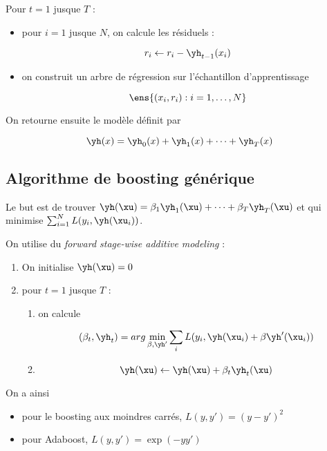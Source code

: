 	Pour $t = 1$ jusque $T$ :
	
	\begin{itemize}
		\item pour $i = 1$ jusque $N$, on calcule les résiduels :
		
		$$r_i \leftarrow r_i - \yh_{t - 1}(x_i)$$
		
		\item on construit un arbre de régression sur l'échantillon d'apprentissage
		
		$$\ens{(x_i, r_i) : i = 1, \dots , N}$$
	\end{itemize}
	
	On retourne ensuite le modèle définit par
	
	$$\yh(x) = \yh_0(x) + \yh_1(x) + \dots + \yh_T(x)$$
	
	
	\subsection{Algorithme de boosting générique}
	
	Le but est de trouver $\yh(\xu) = \beta_1 \yh_1(\xu) + \dots + \beta_T \yh_T(\xu)$ et qui minimise $\sum_{i = 1}^N L(y_i, \yh(\xu_i))$.
	
	On utilise du \textit{forward stage-wise additive modeling} :
	
	\begin{enumerate}
		\item On initialise $\yh(\xu) = 0$
		\item pour $t = 1$ jusque $T$ :
		
		\begin{enumerate}
			\item on calcule
			
			$$(\beta_t, \yh_t) = arg \min_{\beta, \yh'} \sum_i L(y_i, \yh(\xu_i) + \beta \yh'(\xu_i))$$
			\item 
			
			$$\yh(\xu) \leftarrow \yh(\xu) + \beta_t \yh_t(\xu)$$
		\end{enumerate}
	\end{enumerate}
	
	On a ainsi
	
	\begin{itemize}
		\item pour le boosting aux moindres carrés, $L(y, y') = (y - y')^2$
		\item pour Adaboost, $L(y, y') = \exp{(-y y')}$
	\end{itemize}
	
	
